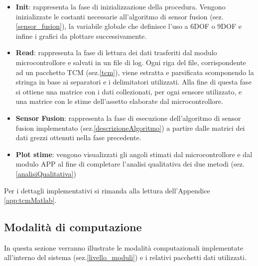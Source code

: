 \begin{itemize}
	\item \textbf{Init}: rappresenta la fase di inizializzazione della procedura. Vengono inizializzate le costanti necessarie all'algoritmo di sensor fusion (sez.\ref{sensor_fusion}), la variabile globale che definisce l'uso a 6DOF o 9DOF e infine i grafici da plottare successivamente.
	\item  \textbf{Read}: rappresenta la fase di lettura dei dati trasferiti dal modulo microcontrollore e salvati in un file di log. Ogni riga del file, corrispondente ad un pacchetto TCM (sez.\ref{tcm}), viene estratta e parsificata scomponendo la stringa in base ai separatori e i delimitatori utilizzati. Alla fine di questa fase si ottiene una matrice con i dati collezionati, per ogni sensore utilizzato, e una matrice con le stime dell'assetto elaborate dal microcontrollore.
	\item \textbf{Sensor Fusion}: rappresenta la fase di esecuzione dell'algoritmo di sensor fusion implementato (sez.\ref{descrizioneAlgoritmo}) a partire dalle matrici dei dati grezzi ottenuti nella fase precedente.
	\item \textbf{Plot stime}: vengono visualizzati gli angoli stimati dal microcontrollore e dal modulo APP al fine di completare l'analisi qualitativa dei due metodi (sez.\ref{analisiQualitativa})
\end{itemize}
Per i dettagli implementativi si rimanda alla lettura dell'Appendice \ref{app:tcmMatlab}.

\subsection{Modalità di computazione}
\label{computationMode}
In questa sezione verranno illustrate le modalità computazionali implementate all'interno del sistema (sez.\ref{livello_moduli}) e i relativi pacchetti dati utilizzati.

